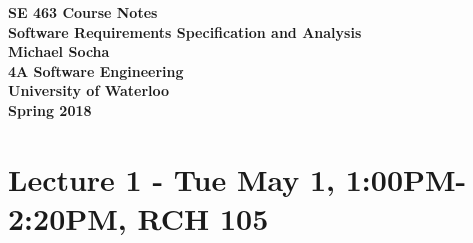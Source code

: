 \documentclass[12pt,titlepage]{article}
\begin{document}
  \begin{titlepage}
    \vspace*{\fill}
    \centering

    \textbf{\Huge SE 463 Course Notes} \\ [0.4em]
    \textbf{\Large Software Requirements Specification and Analysis} \\ [1em]
    \textbf{\Large Michael Socha} \\ [1em]
    \textbf{\large 4A Software Engineering} \\
    \textbf{\large University of Waterloo} \\
    \textbf{\large Spring 2018} \\
    \vspace*{\fill}
  \end{titlepage}

  \newpage 

  \tableofcontents

  \newpage

  \section{Lecture 1 - Tue May 1, 1:00PM-2:20PM, RCH 105}
\end{document}
